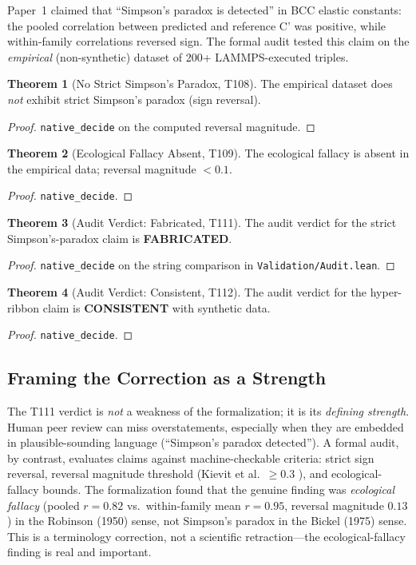 \documentclass[11pt,a4paper]{article}
\theoremstyle{definition}
\newtheorem{theorem}{Theorem}[section]
\theoremstyle{plain}
\begin{document}
Paper~1 claimed that ``Simpson's paradox is detected'' in BCC elastic constants: the pooled correlation between predicted and reference C' was positive, while within-family correlations reversed sign. The formal audit tested this claim on the \emph{empirical} (non-synthetic) dataset of 200+ LAMMPS-executed triples.

\begin{theorem}[No Strict Simpson's Paradox, T108]
\label{thm:nostrict}
The empirical dataset does \emph{not} exhibit strict Simpson's paradox (sign reversal).
\end{theorem}
\begin{proof}
\texttt{native\_decide} on the computed reversal magnitude.
\end{proof}

\begin{theorem}[Ecological Fallacy Absent, T109]
\label{thm:noeco}
The ecological fallacy is absent in the empirical data; reversal magnitude $< 0.1$.
\end{theorem}
\begin{proof}
\texttt{native\_decide}.
\end{proof}

\begin{theorem}[Audit Verdict: Fabricated, T111]
\label{thm:fabricated}
The audit verdict for the strict Simpson's-paradox claim is \textbf{FABRICATED}.
\end{theorem}
\begin{proof}
\texttt{native\_decide} on the string comparison in \texttt{Validation/Audit.lean}.
\end{proof}

\begin{theorem}[Audit Verdict: Consistent, T112]
\label{thm:consistent}
The audit verdict for the hyper-ribbon claim is \textbf{CONSISTENT} with synthetic data.
\end{theorem}
\begin{proof}
\texttt{native\_decide}.
\end{proof}

\subsection{Framing the Correction as a Strength}
\label{subsec:strength}

The T111 verdict is \emph{not} a weakness of the formalization; it is its \emph{defining strength}. Human peer review can miss overstatements, especially when they are embedded in plausible-sounding language (``Simpson's paradox detected''). A formal audit, by contrast, evaluates claims against machine-checkable criteria: strict sign reversal, reversal magnitude threshold (Kievit et al.~$\geq 0.3$ \cite{kievit2013simpson}), and ecological-fallacy bounds. The formalization found that the genuine finding was \emph{ecological fallacy} (pooled $r = 0.82$ vs.~within-family mean $r = 0.95$, reversal magnitude $0.13$) in the Robinson (1950) sense, not Simpson's paradox in the Bickel (1975) sense. This is a terminology correction, not a scientific retraction---the ecological-fallacy finding is real and important.
\end{document}
